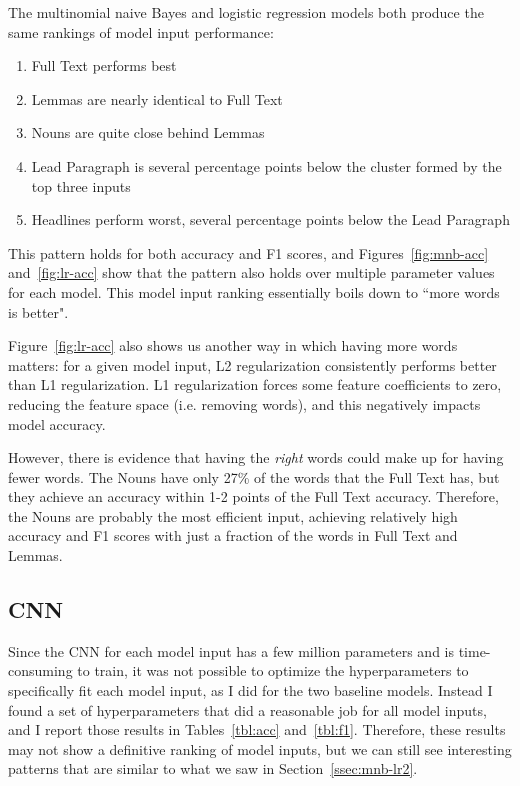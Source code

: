 \documentclass[11pt,a4paper,table]{article}
\begin{document}
The multinomial naive Bayes and logistic regression models both produce the same rankings of model input performance:

\begin{enumerate}
\item Full Text performs best
\item Lemmas are nearly identical to Full Text
\item Nouns are quite close behind Lemmas
\item Lead Paragraph is several percentage points below the cluster formed by the top three inputs
\item Headlines perform worst, several percentage points below the Lead Paragraph
\end{enumerate}

This pattern holds for both accuracy and F1 scores, and Figures~\ref{fig:mnb-acc} and~\ref{fig:lr-acc} show that the pattern also holds over multiple parameter values for each model. This model input ranking essentially boils down to ``more words is better".

Figure~\ref{fig:lr-acc} also shows us another way in which having more words matters: for a given model input, L2 regularization consistently performs better than L1 regularization. L1 regularization forces some feature coefficients to zero, reducing the feature space (i.e. removing words), and this negatively impacts model accuracy.

However, there is evidence that having the \textit{right} words could make up for having fewer words. The Nouns have only 27\% of the words that the Full Text has, but they achieve an accuracy within 1-2 points of the Full Text accuracy. Therefore, the Nouns are probably the most efficient input, achieving relatively high accuracy and F1 scores with just a fraction of the words in Full Text and Lemmas.

\subsection{CNN}
\label{ssec:cnn2}

Since the CNN for each model input has a few million parameters and is time-consuming to train, it was not possible to optimize the hyperparameters to specifically fit each model input, as I did for the two baseline models. Instead I found a set of hyperparameters that did a reasonable job for all model inputs, and I report those results in Tables~\ref{tbl:acc} and~\ref{tbl:f1}. Therefore, these results may not show a definitive ranking of model inputs, but we can still see interesting patterns that are similar to what we saw in Section~\ref{ssec:mnb-lr2}.
\end{document}
